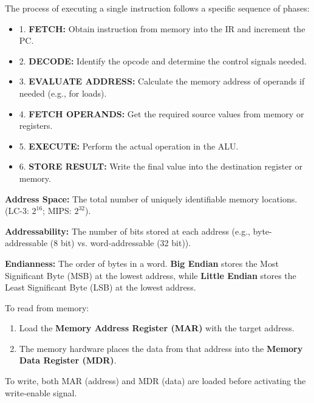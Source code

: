 \begin{remark}
The process of executing a single instruction follows a specific sequence of phases:
\begin{itemize}
    \item 1. \textbf{FETCH:} Obtain instruction from memory into the IR and increment the PC.
    \item 2. \textbf{DECODE:} Identify the opcode and determine the control signals needed.
    \item 3. \textbf{EVALUATE ADDRESS:} Calculate the memory address of operands if needed (e.g., for loads).
    \item 4. \textbf{FETCH OPERANDS:} Get the required source values from memory or registers.
    \item 5. \textbf{EXECUTE:} Perform the actual operation in the ALU.
    \item 6. \textbf{STORE RESULT:} Write the final value into the destination register or memory.
\end{itemize}
\end{remark}

\begin{definition}
\textbf{Address Space:} The total number of uniquely identifiable memory locations. (LC-3: $2^{16}$; MIPS: $2^{32}$).
\end{definition}

\begin{definition}
\textbf{Addressability:} The number of bits stored at each address (e.g., byte-addressable (8 bit) vs. word-addressable (32 bit)).
\end{definition}

\begin{definition}
\textbf{Endianness:} The order of bytes in a word. \textbf{Big Endian} stores the Most Significant Byte (MSB) at the lowest address, while \textbf{Little Endian} stores the Least Significant Byte (LSB) at the lowest address.
\end{definition}

\begin{example}
To read from memory:
\begin{enumerate}
    \item Load the \textbf{Memory Address Register (MAR)} with the target address.
    \item The memory hardware places the data from that address into the \textbf{Memory Data Register (MDR)}.
\end{enumerate}
To write, both MAR (address) and MDR (data) are loaded before activating the write-enable signal.
\end{example}

